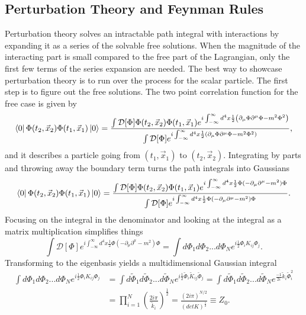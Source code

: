 \documentclass[12pt]{article}
\begin{document}
\subsection{Perturbation Theory and Feynman Rules}
Perturbation theory solves an intractable path integral with interactions by expanding it as a series of the solvable free solutions. When the magnitude of the interacting part is small compared to the free part of the Lagrangian, only the first few terms of the series expansion are needed. The best way to showcase perturbation theory is to run over the process for the scalar particle. The first step is to figure out the free solutions. The two point correlation function for the free case is given by
\begin{equation}
\bra{0}\Phi(t_2,\vec{x}_2)\Phi(t_1,\vec{x}_1)\ket{0} = 
\frac{\int \mathcal{D}[\Phi]\Phi(t_2,\vec{x}_2)\Phi(t_1,\vec{x}_1)e^{i\int_{-\infty}^{\infty} d^4x \frac{1}{2}\left(\partial_\mu\Phi\partial^\mu\Phi - m^2 \Phi^2 \right)}}
{\int \mathcal{D}[\Phi]e^{i\int_{-\infty}^{\infty} d^4x \frac{1}{2}\left(\partial_\mu\Phi\partial^\mu\Phi - m^2 \Phi^2 \right)}},
\end{equation}
and it describes a particle going from $(t_1,\vec{x}_1)$ to $(t_2,\vec{x}_2)$. Integrating by parts and throwing away the boundary term turns the path integrals into Gaussians 
\begin{equation}
\label{eq:phi2pt}
\bra{0}\Phi(t_2,\vec{x}_2)\Phi(t_1,\vec{x}_1)\ket{0} = 
\frac{\int \mathcal{D}[\Phi]\Phi(t_2,\vec{x}_2)\Phi(t_1,\vec{x}_1)e^{i\int_{-\infty}^{\infty} d^4x \frac{1}{2}\Phi (-\partial_\mu\partial^\mu - m^2)\Phi}}
{\int \mathcal{D}[\Phi]e^{i\int_{-\infty}^{\infty} d^4x \frac{1}{2}\Phi (-\partial_\mu\partial^\mu - m^2)\Phi}}.
\end{equation}
Focusing on the integral in the denominator and looking at the integral as a matrix multiplication simplifies things 
\begin{equation}
\int \mathcal{D}[\Phi]e^{i\int_{-\infty}^{\infty} d^4x \frac{1}{2}\Phi (-\partial_\mu\partial^\mu - m^2)\Phi}
= \int d\Phi_1 d\Phi_2 ... d\Phi_N e^{i\frac{1}{2}\Phi_{i} K_{ij} \Phi_{j}}.
\end{equation}
Transforming to the eigenbasis yields a multidimensional Gaussian integral
\begin{equation}
\begin{split}
 \int d\Phi_1 d\Phi_2 ... d\Phi_N e^{i\frac{1}{2}\Phi_{i} K_{ij} \Phi_{j}} 
 &= \int d\tilde{\Phi}_1 d\tilde{\Phi}_2 ... d\tilde{\Phi}_N e^{i\frac{1}{2}\tilde{\Phi}_{i} \tilde{K}_{ij} \tilde{\Phi}_{j}} 
 = \int d\tilde{\Phi}_1 d\tilde{\Phi}_2 ... d\tilde{\Phi}_N e^{\frac{-1}{2i} \tilde{k}_i \tilde{\Phi}_{i}^2} \\ 
& = \prod_{i=1}^N \left( \frac{2i\pi}{\tilde{k}_i} \right)^\frac{1}{2} = \frac{\left( 2i\pi \right)^{N/2}}{ \left( detK \right)^\frac{1}{2}} \equiv Z_0.
\end{split}
\end{equation}
\end{document}
